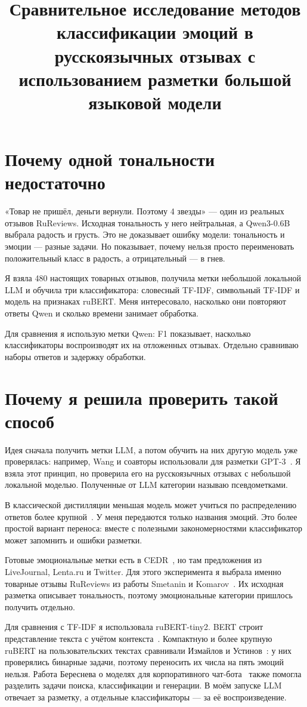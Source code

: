 \documentclass{misisarticle}
\title{Сравнительное исследование методов классификации эмоций в русскоязычных отзывах с использованием разметки большой языковой модели}
\begin{document}
\raggedbottom
\maketitle
\section{Почему одной тональности недостаточно}
«Товар не пришёл, деньги вернули. Поэтому 4 звезды» --- один из реальных отзывов RuReviews. Исходная тональность у него нейтральная, а Qwen3-0.6B выбрала радость и грусть. Это не доказывает ошибку модели: тональность и эмоции --- разные задачи. Но показывает, почему нельзя просто переименовать положительный класс в радость, а отрицательный --- в гнев.

Я взяла 480 настоящих товарных отзывов, получила метки небольшой локальной LLM и обучила три классификатора: словесный TF-IDF, символьный TF-IDF и модель на признаках ruBERT. Меня интересовало, насколько они повторяют ответы Qwen и сколько времени занимает обработка.

Для сравнения я использую метки Qwen: F1 показывает, насколько классификаторы воспроизводят их на отложенных отзывах. Отдельно сравниваю наборы ответов и задержку обработки.

\section{Почему я решила проверить такой способ}
Идея сначала получить метки LLM, а потом обучить на них другую модель уже проверялась: например, Wang и соавторы использовали для разметки GPT-3~\cite{wang}. Я взяла этот принцип, но проверила его на русскоязычных отзывах с небольшой локальной моделью. Полученные от LLM категории называю псевдометками.

В классической дистилляции меньшая модель может учиться по распределению ответов более крупной~\cite{hinton}. У меня передаются только названия эмоций. Это более простой вариант переноса: вместе с полезными закономерностями классификатор может запомнить и ошибки разметки.

Готовые эмоциональные метки есть в CEDR~\cite{sboev,cedr}, но там предложения из LiveJournal, Lenta.ru и Twitter. Для этого эксперимента я выбрала именно товарные отзывы RuReviews из работы Smetanin и Komarov~\cite{smetanin,rureviews}. Их исходная разметка описывает тональность, поэтому эмоциональные категории пришлось получить отдельно.

Для сравнения с TF-IDF я использовала ruBERT-tiny2. BERT строит представление текста с учётом контекста~\cite{bert,rubert}. Компактную и более крупную ruBERT на пользовательских текстах сравнивали Измайлов и Устинов~\cite{izmailov}: у них проверялись бинарные задачи, поэтому переносить их числа на пять эмоций нельзя. Работа Береснева о моделях для корпоративного чат-бота~\cite{beresnev} также помогла разделить задачи поиска, классификации и генерации. В моём запуске LLM отвечает за разметку, а отдельные классификаторы --- за её воспроизведение.
\end{document}
